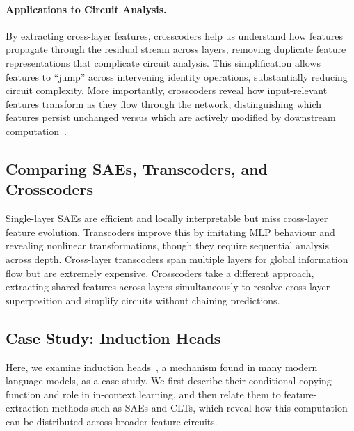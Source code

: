 \paragraph{Applications to Circuit Analysis.}
By extracting cross-layer features, crosscoders help us understand how features propagate through the residual stream across layers, removing duplicate feature representations that complicate circuit analysis. This simplification allows features to ``jump'' across intervening identity operations, substantially reducing circuit complexity. More importantly, crosscoders reveal how input-relevant features transform as they flow through the network, distinguishing which features persist unchanged versus which are actively modified by downstream computation~.

\subsection{Comparing SAEs, Transcoders, and Crosscoders}

Single-layer SAEs are efficient and locally interpretable but miss cross-layer feature evolution. Transcoders improve this by imitating MLP behaviour and revealing nonlinear transformations, though they require sequential analysis across depth. Cross-layer transcoders span multiple layers for global information flow but are extremely expensive. Crosscoders take a different approach, extracting shared features across layers simultaneously to resolve cross-layer superposition and simplify circuits without chaining predictions.


\subsection{Case Study: Induction Heads}
\label{subsec: induc head case study: feature extract}
Here, we examine induction heads~, a mechanism found in many modern language models, as a case study. We first describe their conditional-copying function and role in in-context learning, and then relate them to feature-extraction methods such as SAEs and CLTs, which reveal how this computation can be distributed across broader feature circuits.

